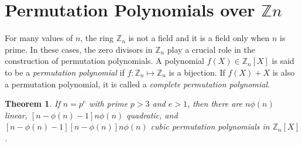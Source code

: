 \documentclass[sn-mathphys,Numbered]{sn-jnl}%
\theoremstyle{thmstyleone}
\newtheorem{theorem}{Theorem}
\theoremstyle{thmstyletwo}
\theoremstyle{thmstylethree}
\begin{document}
\section{Permutation Polynomials over $\mathbb{Z}n$}
For many values of $n$, the ring $\mathbb{Z}_{n}$ is not a field and it is a field only when $n$ is prime. In these cases, the zero divisors in $\mathbb{Z}_{n}$ play a crucial role in the construction of permutation polynomials.
A polynomial $f(X) \in \mathbb{Z}_{n}[X]$ is said to be a \textit{permutation polynomial} if $f:\mathbb{Z}_{n} \mapsto \mathbb{Z}_{n}$ is a bijection. If $f(X)+X$ is also a permutation polynomial, it is called a \textit{complete permutation polynomial}. 
\begin{theorem} \label{rd25}
If $n=p^{e}$ with prime $p>3$ and $e>1$, then there are $n \phi(n)$ linear, $[n-\phi(n)-1]n \phi(n)$ quadratic, and $[n-\phi(n)-1][n-\phi(n)]n \phi(n)$ cubic permutation polynomials in $\mathbb{Z}_{n}[X]$.
\end{theorem}
\end{document}
